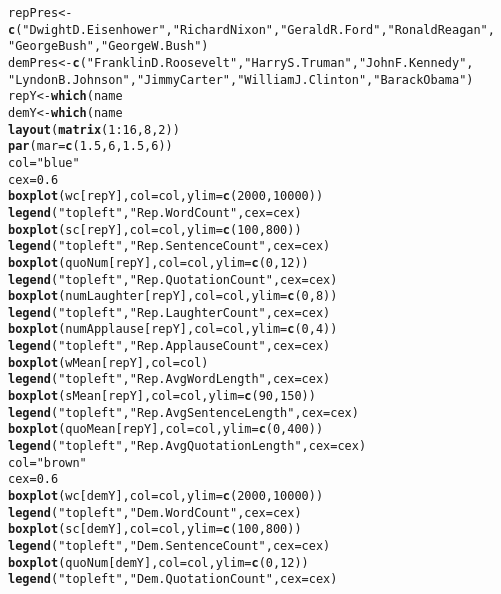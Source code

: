 \documentclass{article}\usepackage{graphicx, color}
\makeatletter
\newcommand{\hlfunctioncall}[1]{\textcolor[rgb]{0.501960784313725,0,0.329411764705882}{\textbf{#1}}}%
\newcommand{\hlstring}[1]{\textcolor[rgb]{0.6,0.6,1}{#1}}%
\newenvironment{kframe}{%
 \def\at@end@of@kframe{}%
 \ifinner\ifhmode%
  \def\at@end@of@kframe{\end{minipage}}%
  \begin{minipage}{\columnwidth}%
 \fi\fi%
 \def\FrameCommand##1{\hskip\@totalleftmargin \hskip-\fboxsep
 \colorbox{shadecolor}{##1}\hskip-\fboxsep
     \hskip-\linewidth \hskip-\@totalleftmargin \hskip\columnwidth}%
 \MakeFramed {\advance\hsize-\width
   \@totalleftmargin\z@ \linewidth\hsize
   \@setminipage}}%
 {\par\unskip\endMakeFramed%
 \at@end@of@kframe}
\newenvironment{knitrout}{}{} %
\makeatother
\begin{document}
\begin{knitrout}
\begin{kframe}
\begin{alltt}
repPres <- \hlfunctioncall{c}(\hlstring{"Dwight D. Eisenhower"}, \hlstring{"Richard Nixon"}, \hlstring{"Gerald R. Ford"}, \hlstring{"Ronald Reagan"}, 
    \hlstring{"George Bush"}, \hlstring{"George W. Bush"})
demPres <- \hlfunctioncall{c}(\hlstring{"Franklin D. Roosevelt"}, \hlstring{"Harry S. Truman"}, \hlstring{"John F. Kennedy"}, 
    \hlstring{"Lyndon B. Johnson"}, \hlstring{"Jimmy Carter"}, \hlstring{"William J. Clinton"}, \hlstring{"Barack Obama"})
repY <- \hlfunctioncall{which}(name %in% repPres)
demY <- \hlfunctioncall{which}(name %in% demPres)
\hlfunctioncall{layout}(\hlfunctioncall{matrix}(1:16, 8, 2))
\hlfunctioncall{par}(mar = \hlfunctioncall{c}(1.5, 6, 1.5, 6))
col = \hlstring{"blue"}
cex = 0.6
\hlfunctioncall{boxplot}(wc[repY], col = col, ylim = \hlfunctioncall{c}(2000, 10000))
\hlfunctioncall{legend}(\hlstring{"topleft"}, \hlstring{"Rep. Word Count"}, cex = cex)
\hlfunctioncall{boxplot}(sc[repY], col = col, ylim = \hlfunctioncall{c}(100, 800))
\hlfunctioncall{legend}(\hlstring{"topleft"}, \hlstring{"Rep. Sentence Count"}, cex = cex)
\hlfunctioncall{boxplot}(quoNum[repY], col = col, ylim = \hlfunctioncall{c}(0, 12))
\hlfunctioncall{legend}(\hlstring{"topleft"}, \hlstring{"Rep. Quotation Count"}, cex = cex)
\hlfunctioncall{boxplot}(numLaughter[repY], col = col, ylim = \hlfunctioncall{c}(0, 8))
\hlfunctioncall{legend}(\hlstring{"topleft"}, \hlstring{"Rep. Laughter Count"}, cex = cex)
\hlfunctioncall{boxplot}(numApplause[repY], col = col, ylim = \hlfunctioncall{c}(0, 4))
\hlfunctioncall{legend}(\hlstring{"topleft"}, \hlstring{"Rep. Applause Count"}, cex = cex)
\hlfunctioncall{boxplot}(wMean[repY], col = col)
\hlfunctioncall{legend}(\hlstring{"topleft"}, \hlstring{"Rep. Avg Word Length"}, cex = cex)
\hlfunctioncall{boxplot}(sMean[repY], col = col, ylim = \hlfunctioncall{c}(90, 150))
\hlfunctioncall{legend}(\hlstring{"topleft"}, \hlstring{"Rep. Avg Sentence Length"}, cex = cex)
\hlfunctioncall{boxplot}(quoMean[repY], col = col, ylim = \hlfunctioncall{c}(0, 400))
\hlfunctioncall{legend}(\hlstring{"topleft"}, \hlstring{"Rep. Avg Quotation Length"}, cex = cex)
col = \hlstring{"brown"}
cex = 0.6
\hlfunctioncall{boxplot}(wc[demY], col = col, ylim = \hlfunctioncall{c}(2000, 10000))
\hlfunctioncall{legend}(\hlstring{"topleft"}, \hlstring{"Dem. Word Count"}, cex = cex)
\hlfunctioncall{boxplot}(sc[demY], col = col, ylim = \hlfunctioncall{c}(100, 800))
\hlfunctioncall{legend}(\hlstring{"topleft"}, \hlstring{"Dem. Sentence Count"}, cex = cex)
\hlfunctioncall{boxplot}(quoNum[demY], col = col, ylim = \hlfunctioncall{c}(0, 12))
\hlfunctioncall{legend}(\hlstring{"topleft"}, \hlstring{"Dem. Quotation Count"}, cex = cex)

\end{alltt}
\end{kframe}
\end{knitrout}
\end{document}
